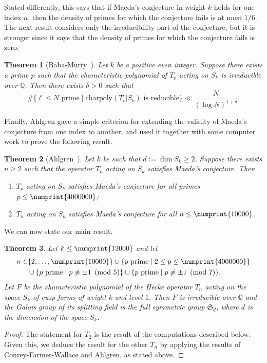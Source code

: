 \documentclass[11pt]{article}
\theoremstyle{plain}
\newtheorem{theorem}{Theorem}[section]
\theoremstyle{definition}
\theoremstyle{remark}
\numberwithin{equation}{section}
\newcommand{\QQ}{\mathbb{Q}}
\renewcommand{\SS}{\mathfrak{S}}
\newcommand{\bound}{\numprint{12000}}
\begin{document}
Stated differently, this says that if Maeda's conjecture in weight $k$ holds
for one index $n$, then the density of primes for which the conjecture
fails is at most $1/6$.  The next result considers only the irreducibility
part of the conjecture, but it is stronger since it says that the density of
primes for which the conjecture fails is zero.

\begin{theorem}[Baba-Murty~\cite{BabaMurty}]
  Let $k$ be a positive even integer.  Suppose there exists a prime $p$ such
  that the characteristic polynomial of $T_p$ acting on $S_k$ is irreducible
  over $\QQ$.  Then there exists $\delta>0$ such that
  \begin{equation*}
    \#\{\ell\leq N\text{ prime}\mid \text{charpoly}(T_\ell|S_k)\text{ is reducible}\}
    \ll \frac{N}{(\log N)^{1+\delta}}.
  \end{equation*}
\end{theorem}

Finally, Ahlgren gave a simple criterion for extending the validity of
Maeda's conjecture from one index to another, and used it together with some
computer work to prove the following result.

\begin{theorem}[Ahlgren~\cite{Ahlgren}]\label{thm:Ahl}
  Let $k$ be such that $d:=\dim S_k\geq 2$.  Suppose there exists $n\geq 2$
  such that the operator $T_n$ acting on $S_k$ satisfies Maeda's conjecture.
  Then
  \begin{enumerate}
    \item $T_p$ acting on $S_k$ satisfies Maeda's conjecture for all primes
      $p\leq\numprint{4000000}$;
    \item $T_n$ acting on $S_k$ satisfies Maeda's conjecture for all
      $n\leq\numprint{10000}$.
  \end{enumerate}
\end{theorem}


We can now state our main result.

\begin{theorem}\label{thm:main}
  Let $k\leq \bound$ and let
  \begin{align*}
    n\in &\{2,\ldots,\numprint{10000}\}\cup
    \{p\text{ prime}\mid 2\leq p\leq\numprint{4000000}\}\\
    &\cup\{p\text{ prime}\mid p\not\equiv\pm 1\pmod{5}\}\cup
    \{p\text{ prime}\mid p\not\equiv\pm 1\pmod{7}\}.
  \end{align*}
  Let $F$ be the characteristic polynomial of the
  Hecke operator $T_n$ acting on the space $S_k$ of cusp forms of weight
  $k$ and level $1$.  Then $F$ is irreducible over $\QQ$ and the Galois
  group of its splitting field is the full symmetric group $\SS_d$, 
  where $d$ is the dimension of the space $S_k$.
\end{theorem}
\begin{proof}
  The statement for $T_2$ is the result of the computations described below.  
  Given this, we deduce the result for the other $T_n$ by applying the results of
  Conrey-Farmer-Wallace and Ahlgren, as stated above.
\end{proof}
\end{document}
